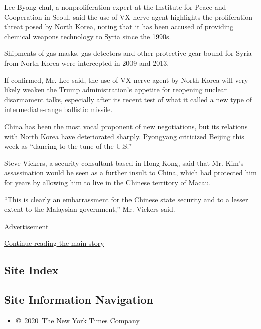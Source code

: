 Lee Byong-chul, a nonproliferation expert at the Institute for Peace and
Cooperation in Seoul, said the use of VX nerve agent highlights the
proliferation threat posed by North Korea, noting that it has been
accused of providing chemical weapons technology to Syria since the
1990s.

Shipments of gas masks, gas detectors and other protective gear bound
for Syria from North Korea were intercepted in 2009 and 2013.

If confirmed, Mr. Lee said, the use of VX nerve agent by North Korea
will very likely weaken the Trump administration's appetite for
reopening nuclear disarmament talks, especially after its recent test of
what it called a new type of intermediate-range ballistic missile.

China has been the most vocal proponent of new negotiations, but its
relations with North Korea have
\href{https://www.nytimes3xbfgragh.onion/2017/02/24/world/asia/china-north-korea-relations-kim-jong-un.html}{deteriorated
sharply}. Pyongyang criticized Beijing this week as ``dancing to the
tune of the U.S.''

Steve Vickers, a security consultant based in Hong Kong, said that Mr.
Kim's assassination would be seen as a further insult to China, which
had protected him for years by allowing him to live in the Chinese
territory of Macau.

``This is clearly an embarrassment for the Chinese state security and to
a lesser extent to the Malaysian government,'' Mr. Vickers said.

Advertisement

\protect\hyperlink{after-bottom}{Continue reading the main story}

\hypertarget{site-index}{%
\subsection{Site Index}\label{site-index}}

\hypertarget{site-information-navigation}{%
\subsection{Site Information
Navigation}\label{site-information-navigation}}

\begin{itemize}
\tightlist
\item
  \href{https://help.nytimes3xbfgragh.onion/hc/en-us/articles/115014792127-Copyright-notice}{©~2020~The
  New York Times Company}
\end{itemize}


